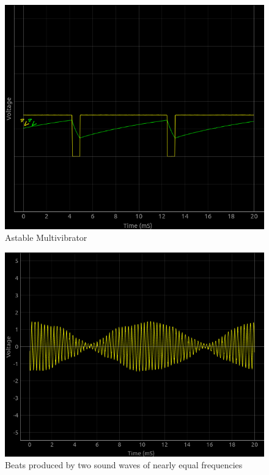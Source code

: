 \begin{figure}[H]
	\centering
	\includegraphics[width=1\columnwidth]{data/5552.png}
	\caption{Astable Multivibrator}
\end{figure}

\begin{figure}[H]
	\centering
	\includegraphics[width=1\columnwidth]{data/beats.png}
	\caption{Beats produced by two sound waves of nearly equal frequencies}
\end{figure}